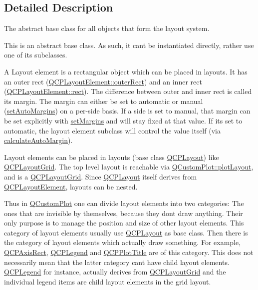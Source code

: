 \subsection{Detailed Description}
The abstract base class for all objects that form the layout system. 

This is an abstract base class. As such, it can\textquotesingle{}t be instantiated directly, rather use one of its subclasses.

A Layout element is a rectangular object which can be placed in layouts. It has an outer rect (\hyperlink{classQCPLayoutElement_a60bbddee2d1230c2414bd776f44d17b8}{Q\+C\+P\+Layout\+Element\+::outer\+Rect}) and an inner rect (\hyperlink{classQCPLayoutElement_affdfea003469aac3d0fac5f4e06171bc}{Q\+C\+P\+Layout\+Element\+::rect}). The difference between outer and inner rect is called its margin. The margin can either be set to automatic or manual (\hyperlink{classQCPLayoutElement_accfda49994e3e6d51ed14504abf9d27d}{set\+Auto\+Margins}) on a per-\/side basis. If a side is set to manual, that margin can be set explicitly with \hyperlink{classQCPLayoutElement_a8f450b1f3f992ad576fce2c63d8b79cf}{set\+Margins} and will stay fixed at that value. If it\textquotesingle{}s set to automatic, the layout element subclass will control the value itself (via \hyperlink{classQCPLayoutElement_a005c9f0fe84bc1591a2cf2c46fd477b4}{calculate\+Auto\+Margin}).

Layout elements can be placed in layouts (base class \hyperlink{classQCPLayout}{Q\+C\+P\+Layout}) like \hyperlink{classQCPLayoutGrid}{Q\+C\+P\+Layout\+Grid}. The top level layout is reachable via \hyperlink{classQCustomPlot_afd280d4d621ae64a106543a545c508d7}{Q\+Custom\+Plot\+::plot\+Layout}, and is a \hyperlink{classQCPLayoutGrid}{Q\+C\+P\+Layout\+Grid}. Since \hyperlink{classQCPLayout}{Q\+C\+P\+Layout} itself derives from \hyperlink{classQCPLayoutElement}{Q\+C\+P\+Layout\+Element}, layouts can be nested.

Thus in \hyperlink{classQCustomPlot}{Q\+Custom\+Plot} one can divide layout elements into two categories\+: The ones that are invisible by themselves, because they don\textquotesingle{}t draw anything. Their only purpose is to manage the position and size of other layout elements. This category of layout elements usually use \hyperlink{classQCPLayout}{Q\+C\+P\+Layout} as base class. Then there is the category of layout elements which actually draw something. For example, \hyperlink{classQCPAxisRect}{Q\+C\+P\+Axis\+Rect}, \hyperlink{classQCPLegend}{Q\+C\+P\+Legend} and \hyperlink{classQCPPlotTitle}{Q\+C\+P\+Plot\+Title} are of this category. This does not necessarily mean that the latter category can\textquotesingle{}t have child layout elements. \hyperlink{classQCPLegend}{Q\+C\+P\+Legend} for instance, actually derives from \hyperlink{classQCPLayoutGrid}{Q\+C\+P\+Layout\+Grid} and the individual legend items are child layout elements in the grid layout. 


